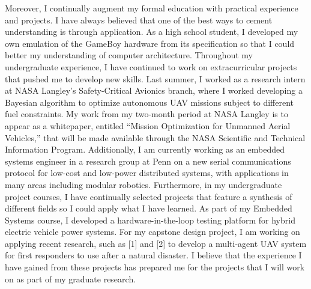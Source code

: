 \documentclass[]{article}
\begin{document}
\pagebreak

Moreover, I continually augment my formal education with practical experience and projects. I have always believed that one of the best ways to cement understanding is through application. As a high school student, I developed my own emulation of the GameBoy hardware from its specification so that I could better my understanding of computer architecture. Throughout my undergraduate experience, I have continued to work on extracurricular projects that pushed me to develop new skills. Last summer, I worked as a research intern at NASA Langley’s Safety-Critical Avionics branch, where I worked developing a Bayesian algorithm to optimize autonomous UAV missions subject to different fuel constraints. My work from my two-month period at NASA Langley is to appear as a whitepaper, entitled “Mission Optimization for Unmanned Aerial Vehicles,” that will be made available through the NASA Scientific and Technical Information Program. Additionally, I am currently working as an embedded systems engineer in a research group at Penn on a new serial communications protocol for low-cost and low-power distributed systems, with applications in many areas including modular robotics. Furthermore, in my undergraduate project courses, I have continually selected projects that feature a synthesis of different fields so I could apply what I have learned. As part of my Embedded Systems course, I developed a hardware-in-the-loop testing platform for hybrid electric vehicle power systems. For my capstone design project, I am working on applying recent research, such as [1] and [2] to develop a multi-agent UAV system for first responders to use after a natural disaster. I believe that the experience I have gained from these projects has prepared me for the projects that I will work on as part of my graduate research.
\end{document}
